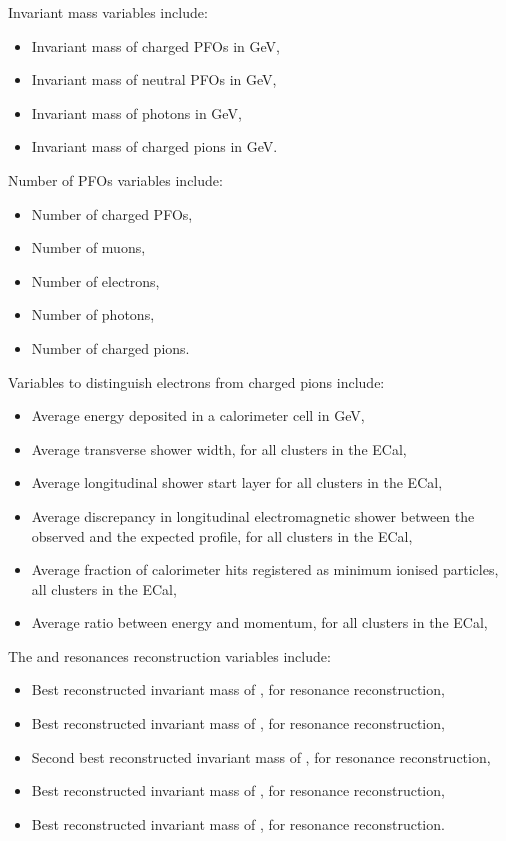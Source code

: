 \documentclass[a4paper,11pt]{article}
\begin{document}
Invariant mass variables include:
\begin{itemize}
 
\item Invariant mass of charged PFOs in GeV,   
\item Invariant mass of neutral PFOs in GeV,   
\item Invariant mass of photons in GeV,  
\item Invariant mass of charged pions in GeV.   
\end{itemize}

Number of PFOs variables include:
\begin{itemize}
\item  Number of charged PFOs,    
\item  Number of muons,
\item  Number of electrons,
\item  Number of photons,
\item  Number of charged pions.
\end{itemize}

Variables to distinguish electrons from charged pions include:
\begin{itemize}
\item  Average energy deposited in a calorimeter cell in GeV,
\item  Average transverse shower width, for all clusters in the ECal,
\item  Average longitudinal shower start layer for all clusters in the ECal,
\item  Average discrepancy in longitudinal electromagnetic shower between the observed and the expected profile, for all clusters in the ECal,
\item Average fraction of calorimeter hits registered as minimum ionised particles, all clusters in the ECal,
\item  Average ratio between  energy and momentum, for all clusters in the ECal,
\end{itemize}

The  and  resonances reconstruction variables include:
\begin{itemize}
\item  Best reconstructed invariant mass of  , for \PaDoP{\PGpm\PGpz\PGpz} resonance reconstruction,

\item  Best reconstructed invariant mass of \PGpz, for \PaDoP{\PGpm\PGpz\PGpz} resonance reconstruction,
\item  Second best reconstructed invariant mass of \PGpz, for \PaDoP{\PGpm\PGpz\PGpz} resonance reconstruction,


\item  Best reconstructed invariant mass of , for \PGrP{\PGpm\PGpz} resonance reconstruction,
\item  Best reconstructed invariant mass of \PGpz, for \PGrP{\PGpm\PGpz} resonance reconstruction.
\end{itemize}
\end{document}
